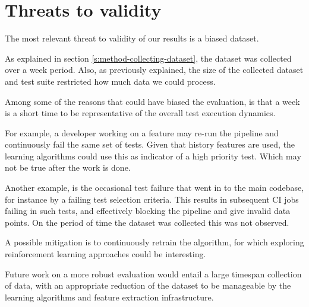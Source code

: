 \section{Threats to validity}\label{s:conclusion-threats}

The most relevant threat to validity of our results is a biased dataset.

As explained in section \ref{s:method-collecting-dataset}, the dataset was 
collected over a week period. Also, as previously explained, the size of 
the collected dataset and test suite restricted how much data we could process.

Among some of the reasons that could have biased the evaluation, is that
a week is a short time to be representative of the overall test execution dynamics.

For example, a developer working on a feature may re-run the pipeline and continuously
fail the same set of tests. Given that history features are used, the learning algorithms
could use this as indicator of a high priority test. Which may not be true after the 
work is done. 

Another example, is the occasional test failure that went in to the main codebase,
for instance by a failing test selection criteria. This results in subsequent CI jobs
failing in such tests, and effectively blocking the pipeline and give invalid data points.
On the period of time the dataset was collected this was not observed.

A possible mitigation is to continuously retrain the algorithm, for which exploring
reinforcement learning approaches could be interesting.

Future work on a more robust evaluation would entail a large timespan collection of
data, with an appropriate reduction of the dataset to be manageable by the learning 
algorithms and feature extraction infrastructure.
